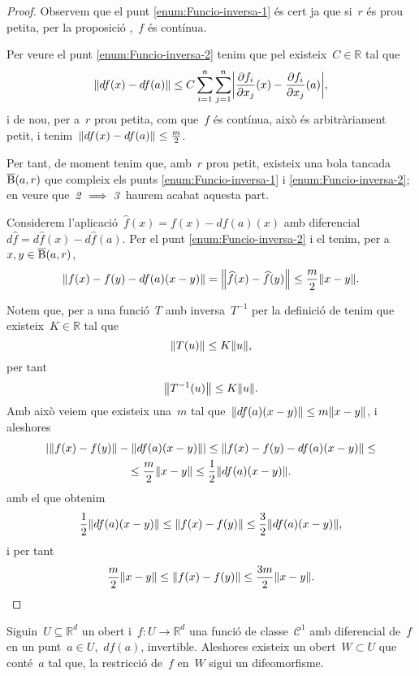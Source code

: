 \documentclass[../calcul-en-diverses-variables.tex]{subfiles}
\begin{document}
    \begin{proof}
        Observem que el punt \eqref{enum:Funcio-inversa-1} és cert ja que si~\(r\) és prou petita, per la proposició ,~\(f\) és contínua.

        Per veure el punt \eqref{enum:Funcio-inversa-2} tenim que pel  existeix~\(C\in\mathbb{R}\) tal que
        \[
            \norm{df(x)-df(a)}\leq C\sum_{i=1}^{n}\sum_{j=1}^{n}\abs{\frac{\partial f_{i}}{\partial x_{j}}(x)-\frac{\partial f_{i}}{\partial x_{j}}(a)},
        \]
        i de nou, per a~\(r\) prou petita, com que~\(f\) és contínua, això és arbitràriament petit, i tenim~\(\norm{df(x)-df(a)}\leq\frac{m}{2}\).

        Per tant, de moment tenim que, amb~\(r\) prou petit, existeix una bola tancada~\(\overline{\operatorname{B}}(a,r)\) que compleix els punts \eqref{enum:Funcio-inversa-1} i \eqref{enum:Funcio-inversa-2}; en veure que~\(\mathit{2}\implies\mathit{3}\) haurem acabat aquesta part.

        Considerem l'aplicació~\(\widehat{f}(x)=f(x)-df(a)(x)\) amb diferencial~\(d\widehat{f}=d\widehat{f}(x)-d\widehat{f}(a)\).
        Per el punt \eqref{enum:Funcio-inversa-2} i el  tenim, per a~\(x,y\in\overline{\operatorname{B}}(a,r)\), %
        \[
            \norm{f(x)-f(y)-df(a)(x-y)}=\norm{\widehat{f}(x)-\widehat{f}(y)}\leq\frac{m}{2}\norm{x-y}.
        \]

        Notem que, per a una funció~\(T\) amb inversa~\(T^{-1}\) per la definició de  tenim que existeix~\(K\in\mathbb{R}\) tal que
        \[
            \norm{T(u)}\leq K\norm{u},
        \]
        per tant
        \[
            \norm{T^{-1}(u)}\leq K\norm{u}.
        \]
        Amb això veiem que existeix una~\(m\) tal que~\(\norm{df(a)(x-y)}\leq m\norm{x-y}\), i aleshores
        \begin{multline*}
        \abs{\norm{f(x)-f(y)}-\norm{df(a)(x-y)}}\leq\norm{f(x)-f(y)-df(a)(x-y)}\leq\\\leq\frac{m}{2}\norm{x-y}\leq\frac{1}{2}\norm{df(a)(x-y)}.
        \end{multline*}
        amb el que obtenim
        \[
            \frac{1}{2}\norm{df(a)(x-y)}\leq\norm{f(x)-f(y)}\leq\frac{3}{2}\norm{df(a)(x-y)},
        \]
        i per tant
        \[
            \frac{m}{2}\norm{x-y}\leq\norm{f(x)-f(y)}\leq\frac{3m}{2}\norm{x-y}.\qedhere
        \]
    \end{proof}
    \begin{theorem}
        \label{thm:Funcio-inversa}
        Siguin~\(U\subseteq\mathbb{R}^{d}\) un obert i~\(f\colon U\to\mathbb{R}^{d}\) una funció de classe~\(\mathcal{C}^{1}\) amb diferencial de~\(f\) en un punt~\(a\in U\),~\(df(a)\), invertible.
        Aleshores existeix un obert~\(W\subset U\) que conté~\(a\) tal que, la restricció de~\(f\) en~\(W\) sigui un difeomorfisme.
    \end{theorem}
\end{document}
